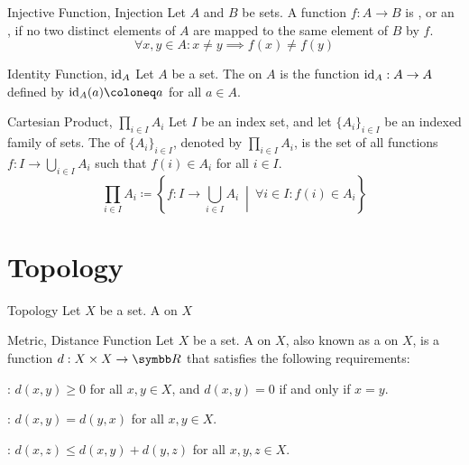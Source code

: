 \documentclass[12pt]{report}
\begin{document}
\begin{dfnbox}{Injective Function, Injection}
	Let $A$ and $B$ be sets. A function $f: A \to B$ is , or an , if no two distinct elements of $A$ are mapped to the same element of $B$ by $f$.
	\[ \forall x, y \in A : x \ne y \implies f(x) \ne f(y) \]
\end{dfnbox}

\begin{dfnbox}{Identity Function, $\operatorname{id}_A$}
	Let $A$ be a set. The  on $A$ is the function $\operatorname{id}_A: A \to A$ defined by $\id_A(a) \coloneq a$ for all $a \in A$.
\end{dfnbox}

\begin{dfnbox}{Cartesian Product, $\prod_{i \in I} A_i$}
	Let $I$ be an index set, and let $\{ A_i \}_{i \in I}$ be an indexed family of sets. The  of $\{ A_i \}_{i \in I}$, denoted by $\prod_{i \in I} A_i$, is the set of all functions $f: I \to \bigcup_{i \in I} A_i$ such that $f(i) \in A_i$ for all $i \in I$.
	\[ \prod_{i \in I} A_i \coloneq \left\{ f: I \to \bigcup_{i \in I} A_i \ \middle|\ \forall i \in I : f(i) \in A_i \right\} \]
\end{dfnbox}



\chapter{Topology}

\begin{dfnbox}{Topology}
	Let $X$ be a set. A  on $X$
\end{dfnbox}

\begin{dfnbox}{Metric, Distance Function}
	Let $X$ be a set. A  on $X$, also known as a  on $X$, is a function $d: X \times X \to \R$ that satisfies the following requirements:
	\begin{boxitems}
		\item {}: $d(x, y) \ge 0$ for all $x, y \in X$, and $d(x, y) = 0$ if and only if $x = y$.
		\item {}: $d(x, y) = d(y, x)$ for all $x, y \in X$.
		\item {}: $d(x, z) \le d(x, y) + d(y, z)$ for all $x, y, z \in X$.
	\end{boxitems}
\end{dfnbox}
\end{document}
